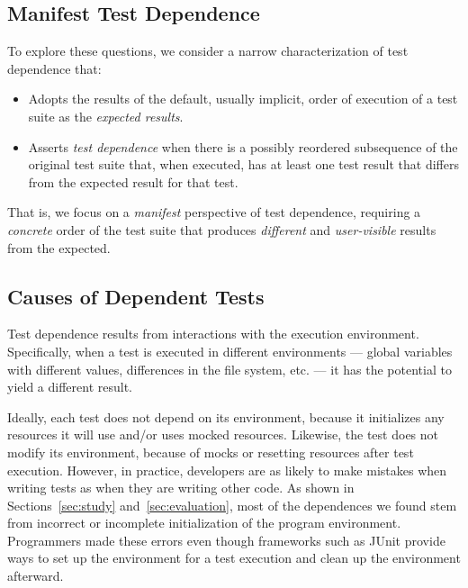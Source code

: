 \subsection{Manifest Test Dependence}

To explore these questions, we consider a narrow characterization
of test dependence that:
\begin{itemize}
\item Adopts the results of the default, usually implicit,
  order of execution of a test suite as the \emph{expected results}. 
\item Asserts \emph{test dependence} when there is a possibly
  reordered subsequence of the original test suite that, when
  executed, has at least one test result that differs from the
  expected result for that test.  
\end{itemize}
That is, we focus on a \emph{manifest} perspective of test dependence,
requiring a \emph{concrete} order of the test suite that
produces \emph{different} and \emph{user-visible} results from the expected.  


\subsection{Causes of Dependent Tests}


Test dependence results from interactions with the execution environment.
Specifically, when a
test is executed in different environments --- global variables
with different values, differences in the file system, etc. --- it has the
potential to yield
a different result.  

Ideally, each test does not depend on its environment, because it
initializes any resources it will use and/or uses mocked resources.
Likewise, the test does not modify its environment, because of mocks or
resetting resources after test execution. However, in practice,
developers are as likely
to make mistakes when writing tests as when they are writing other code.
As shown in Sections~\ref{sec:study} and~\ref{sec:evaluation}, most of the dependences we found
stem from incorrect or incomplete initialization
of the program environment.
Programmers made these errors even though frameworks such as
JUnit provide ways to set up the environment for a test execution and clean
up the environment afterward.



